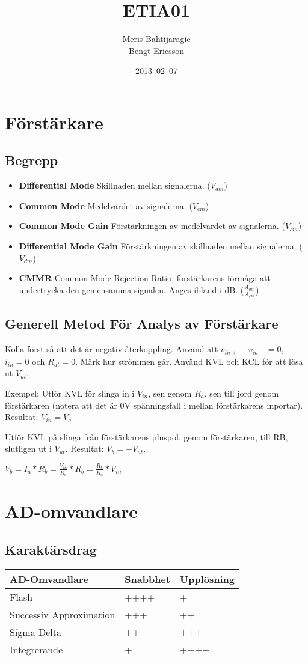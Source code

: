 \documentclass[11pt]{article}
\title{ETIA01}
\author{Meris Bahtijaragic\\Bengt Ericsson}
\date{2013--02--07}
\begin{document}
\maketitle

\section{Förstärkare}
\subsection{Begrepp}
\begin{itemize}
  \item \textbf{Differential Mode} Skillnaden mellan signalerna. ($V_{dm}$)
  \item \textbf{Common Mode} Medelvärdet av signalerna. ($V_{cm}$)
  \item \textbf{Common Mode Gain} Förstärkningen av medelvärdet av signalerna. ($V_{cm}$)
  \item \textbf{Differential Mode Gain} Förstärkningen av skillnaden mellan signalerna. ($V_{dm}$)
  \item \textbf{CMMR} Common Mode Rejection Ratio, förstärkarens förmåga att undertrycka den gemensamma signalen. Anges ibland i dB. ($\frac{A_{dm}}{A_{cm}}$)
\end{itemize}

\subsection{Generell Metod För Analys av Förstärkare}
Kolla först så att det är negativ återkoppling.
Använd att $v_{in+} - v_{in-} = 0$, $i_{in} = 0$ och $R_{ut} = 0$.
Märk hur strömmen går.
Använd KVL och KCL för att lösa ut $V_{ut}$.

Exempel:
Utför KVL för slinga in i $V_{in}$, sen genom $R_{a}$, sen till jord genom förstärkaren
(notera att det är 0V spänningsfall i mellan förstärkarens inportar).
Resultat: $V_{in} = V_a$

Utför KVL på slinga från förstärkarens pluspol, genom förstärkaren, till RB, slutligen ut i $V_{ut}$.
Resultat: $V_{b} = -V_{ut}$.

$V_{b} = I_{a} * R_b = \frac{V_{in}}{R_a} * R_b = \frac{R_b}{R_a} * V_{in}$

\section{AD-omvandlare}
\subsection{Karaktärsdrag}
\begin{tabular}{ |l|l|l| }
  \hline
  AD-Omvandlare & Snabbhet & Upplösning \\
  \hline
  Flash & ++++ & + \\
  Successiv Approximation & +++ & ++ \\
  Sigma Delta & ++ & +++\\
  Integrerande & + & ++++ \\
  \hline
\end{tabular}
\end{document}
